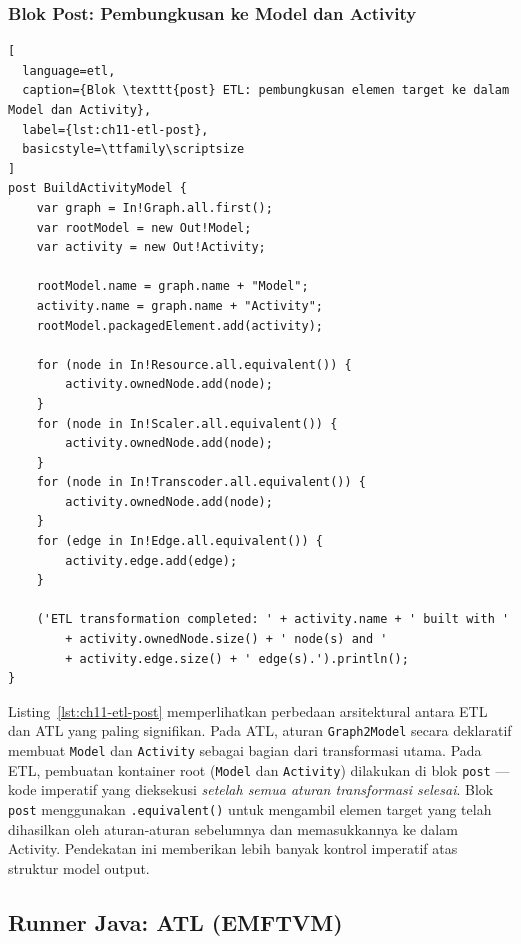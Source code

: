 \subsubsection{Blok Post: Pembungkusan ke Model dan Activity}

\begin{lstlisting}[
  language=etl,
  caption={Blok \texttt{post} ETL: pembungkusan elemen target ke dalam Model dan Activity},
  label={lst:ch11-etl-post},
  basicstyle=\ttfamily\scriptsize
]
post BuildActivityModel {
    var graph = In!Graph.all.first();
    var rootModel = new Out!Model;
    var activity = new Out!Activity;

    rootModel.name = graph.name + "Model";
    activity.name = graph.name + "Activity";
    rootModel.packagedElement.add(activity);

    for (node in In!Resource.all.equivalent()) {
        activity.ownedNode.add(node);
    }
    for (node in In!Scaler.all.equivalent()) {
        activity.ownedNode.add(node);
    }
    for (node in In!Transcoder.all.equivalent()) {
        activity.ownedNode.add(node);
    }
    for (edge in In!Edge.all.equivalent()) {
        activity.edge.add(edge);
    }

    ('ETL transformation completed: ' + activity.name + ' built with '
        + activity.ownedNode.size() + ' node(s) and '
        + activity.edge.size() + ' edge(s).').println();
}
\end{lstlisting}

\noindent Listing~\ref{lst:ch11-etl-post} memperlihatkan perbedaan arsitektural antara ETL dan ATL yang paling signifikan. Pada ATL, aturan \texttt{Graph2Model} secara deklaratif membuat \texttt{Model} dan \texttt{Activity} sebagai bagian dari transformasi utama. Pada ETL, pembuatan kontainer root (\texttt{Model} dan \texttt{Activity}) dilakukan di blok \texttt{post} --- kode imperatif yang dieksekusi \textit{setelah semua aturan transformasi selesai}. Blok \texttt{post} menggunakan \texttt{.equivalent()} untuk mengambil elemen target yang telah dihasilkan oleh aturan-aturan sebelumnya dan memasukkannya ke dalam Activity. Pendekatan ini memberikan lebih banyak kontrol imperatif atas struktur model output.

\subsection{Runner Java: ATL (EMFTVM)}


